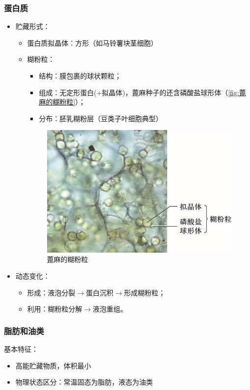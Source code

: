  \subsubsection{蛋白质}
 \begin{itemize}
 	\item 贮藏形式：
 	\begin{itemize}
 		\item 蛋白质拟晶体：方形（如马铃薯块茎细胞）
 		\item 糊粉粒：
 		\begin{itemize}
 			\item 结构：膜包裹的球状颗粒；
 			\item 组成：无定形蛋白(+拟晶体)，蓖麻种子的还含磷酸盐球形体（\autoref{fig:蓖麻的糊粉粒}）；
 			\item 分布：胚乳糊粉层（豆类子叶细胞典型）
 		\end{itemize}
 		
 		\begin{figure}[htbp]
 			\centering
 			\includegraphics[width=0.5\linewidth]{Pics/蓖麻的磷酸盐球形体}
 			\caption{蓖麻的糊粉粒}
 			\label{fig:蓖麻的糊粉粒}
 		\end{figure}
 		
 	\end{itemize}
 	\item 动态变化：
 	\begin{itemize}
 		\item 形成：液泡分裂$\longrightarrow$蛋白沉积$\longrightarrow$形成糊粉粒；
 		\item 利用：糊粉粒分解$\longrightarrow$液泡重组。
 	\end{itemize}
 \end{itemize}
 
 \subsubsection{脂肪和油类}
	基本特征：
 	\begin{itemize}
 		\item 高能贮藏物质，体积最小
 		\item 物理状态区分：常温固态为脂肪，液态为油类
 	\end{itemize}
 	
